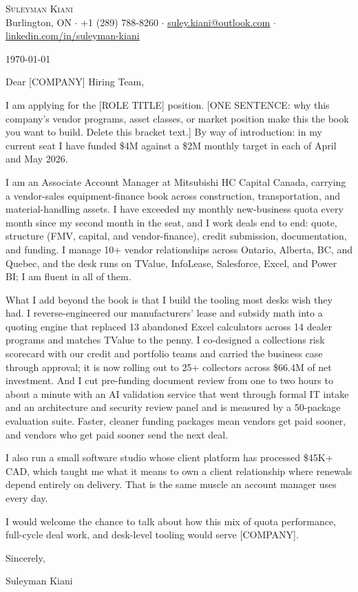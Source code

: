 \documentclass[letterpaper,11pt]{article}
\newcommand{\company}{[COMPANY]}
\newcommand{\role}{[ROLE TITLE]}
\newcommand{\hook}{[ONE SENTENCE: why this company's vendor programs, asset classes, or market position make this the book you want to build. Delete this bracket text.]}
\begin{document}
\begin{center}
    {\Huge \scshape Suleyman Kiani} \\ \vspace{3pt}
    \small Burlington, ON $\cdot$ +1 (289) 788-8260 $\cdot$ \href{mailto:suley.kiani@outlook.com}{\underline{suley.kiani@outlook.com}} $\cdot$ \href{https://www.linkedin.com/in/suleyman-kiani}{\underline{linkedin.com/in/suleyman-kiani}}
\end{center}

\vspace{8pt}
\today

Dear \company{} Hiring Team,

I am applying for the \role{} position. \hook{} By way of introduction: in my current seat I have funded \$4M against a \$2M monthly target in each of April and May 2026.

I am an Associate Account Manager at Mitsubishi HC Capital Canada, carrying a vendor-sales equipment-finance book across construction, transportation, and material-handling assets. I have exceeded my monthly new-business quota every month since my second month in the seat, and I work deals end to end: quote, structure (FMV, capital, and vendor-finance), credit submission, documentation, and funding. I manage 10+ vendor relationships across Ontario, Alberta, BC, and Quebec, and the desk runs on TValue, InfoLease, Salesforce, Excel, and Power BI; I am fluent in all of them.

What I add beyond the book is that I build the tooling most desks wish they had. I reverse-engineered our manufacturers' lease and subsidy math into a quoting engine that replaced 13 abandoned Excel calculators across 14 dealer programs and matches TValue to the penny. I co-designed a collections risk scorecard with our credit and portfolio teams and carried the business case through approval; it is now rolling out to 25+ collectors across \$66.4M of net investment. And I cut pre-funding document review from one to two hours to about a minute with an AI validation service that went through formal IT intake and an architecture and security review panel and is measured by a 50-package evaluation suite. Faster, cleaner funding packages mean vendors get paid sooner, and vendors who get paid sooner send the next deal.

I also run a small software studio whose client platform has processed \$45K+ CAD, which taught me what it means to own a client relationship where renewals depend entirely on delivery. That is the same muscle an account manager uses every day.

I would welcome the chance to talk about how this mix of quota performance, full-cycle deal work, and desk-level tooling would serve \company{}.

Sincerely,

Suleyman Kiani
\end{document}
